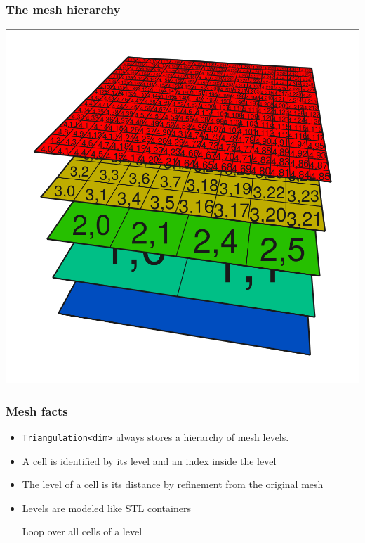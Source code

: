 \begin{frame}
  \frametitle{The mesh hierarchy}
  \begin{center}
    \includegraphics[height=.9\textheight]{graph/step1-1a}
  \end{center}
\end{frame}

\begin{frame}
  \frametitle{Mesh facts}
  \begin{itemize}
  \item \lstinline!Triangulation<dim>! always stores a hierarchy of
    mesh levels.
  \item A cell is identified by its level and an index inside the level
  \item The level of a cell is its distance by refinement from the
    original mesh
  \item Levels are modeled like STL containers
  \begin{block}{Loop over all cells of a level}
      
  \end{block}
  \end{itemize}
\end{frame}

